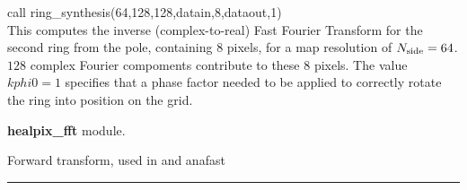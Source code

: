\begin{example}
{
call ring\_synthesis(64,128,128,datain,8,dataout,1)   \\
}
{
This computes the inverse (complex-to-real) Fast Fourier Transform for
the second ring from the pole, containing $8$ pixels, for a map
resolution of $N_{\mathrm{side}}=64$. $128$ complex Fourier
compoments contribute to these 8 pixels. The value $kphi0=1$ specifies
that a phase factor needed to be applied to correctly
rotate the ring into position on the \healpix grid.
}
\end{example}

\begin{modules}
  \begin{sulist}{} %
  \item[\textbf{healpix\_fft}] module.
  \end{sulist}
\end{modules}

\begin{related}
  \begin{sulist}{} %
  \item[\htmlref{ring\_analysis}{sub:ring_analysis}] Forward transform, used in
   and anafast 
  \end{sulist}
\end{related}

\rule{\hsize}{2mm}

\newpage
